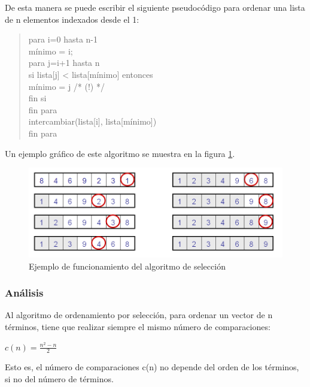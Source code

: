 \documentclass[8pt, A4]{article}    %
\newcommand\tab[1][1cm]{\hspace*{#1}}
\begin{document}
De esta manera se puede escribir el siguiente pseudocódigo para ordenar una lista de n elementos indexados desde el 1:
\begin{quote}
para i=0 hasta n-1\\
    \tab mínimo = i;\\
    \tab para j=i+1 hasta n\\
        \tab \tab si lista[j] < lista[mínimo] entonces\\
            \tab \tab \tab mínimo = j /* (!) */\\
        \tab \tab fin si\\
    \tab fin para\\
    \tab intercambiar(lista[i], lista[mínimo])\\
fin para\\
\end{quote}

Un ejemplo gráfico de este algoritmo se muestra en la figura \ref{fig:selectionSortInfo}.

\begin{figure}[h]
\begin{center}
\includegraphics[width=1\textwidth]{graph/selectionSortInfo}
\end{center}
\caption{Ejemplo de funcionamiento del algoritmo de selección}
\label{fig:selectionSortInfo}
\end{figure}

\subsubsection{Análisis}
 
Al algoritmo de ordenamiento por selección, para ordenar un vector de n términos, tiene que realizar siempre el mismo número de comparaciones:

\begin{center}
${\displaystyle c(n)={\frac {n^{2}-n}{2}}}$
\end{center}

Esto es, el número de comparaciones c(n) no depende del orden de los términos, si no del número de términos.
\end{document}
